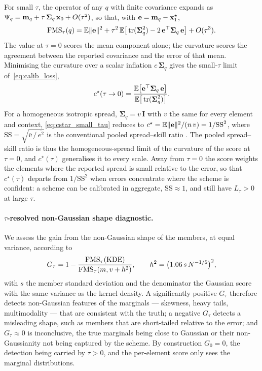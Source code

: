 For small $\tau$, the operator of any $q$ with finite covariance expands as
$\Psi_q = \mathbf{m}_q + \tau\,\boldsymbol{\Sigma}_q\,\mathbf{x}_0 + O(\tau^2)$, so that, with $\mathbf{e} = \mathbf{m}_q - \mathbf{x}_1^\star$,
\begin{equation}\label{eq:fms_small_tau}
  \mathrm{FMS}_\tau(q) = \mathbb{E}\|\mathbf{e}\|^2
  + \tau^2\,\mathbb{E}\big[\operatorname{tr}(\boldsymbol{\Sigma}_q^2) - 2\,\mathbf{e}^\top\boldsymbol{\Sigma}_q\,\mathbf{e}\big]
  + O(\tau^3).
\end{equation}
The value at $\tau = 0$ scores the mean component alone; the curvature scores the
agreement between the reported covariance and the error of that mean. Minimising the curvature over a scalar inflation $c\,\boldsymbol{\Sigma}_q$ gives the small-$\tau$ limit of~\eqref{eq:calib_loss},
\begin{equation}\label{eq:cstar_small_tau}
  c^\star(\tau \to 0) =
  \frac{\mathbb{E}\big[\mathbf{e}^\top\boldsymbol{\Sigma}_q\,\mathbf{e}\big]}
       {\mathbb{E}\big[\operatorname{tr}(\boldsymbol{\Sigma}_q^2)\big]} .
\end{equation}
For a homogeneous isotropic spread, $\boldsymbol{\Sigma}_q = v\,\mathbf{I}$ with $v$ the same for every element and context, \eqref{eq:cstar_small_tau} reduces to
$c^\star = \mathbb{E}\|\mathbf{e}\|^2 / (n\,v) = 1/\mathrm{SS}^2$, where
$\mathrm{SS} = \sqrt{\overline{v}\,/\,\overline{e^2}}$ is the conventional pooled
spread--skill ratio \cite{leutbecher_ensemble_2008,fortin_why_2014}. The pooled spread--skill ratio is thus the homogeneous-spread limit of the curvature of the score at $\tau = 0$, and $c^\star(\tau)$ generalises it to every scale. Away from $\tau = 0$ the score weights the elements where the reported spread is small relative to the error, so that $c^\star(\tau)$ departs from $1/\mathrm{SS}^2$ when errors concentrate where the scheme is confident: a scheme can be calibrated in aggregate, $\mathrm{SS} \approx 1$, and still have $L_\tau > 0$ at large $\tau$.

\paragraph{$\tau$-resolved non-Gaussian shape diagnostic.} We assess the gain from the non-Gaussian shape of the members, at equal variance, according to
\begin{equation}\label{eq:shape_gain}
  G_\tau = 1-\frac{\mathrm{FMS}_\tau(\text{KDE})}{\mathrm{FMS}_\tau(m, v + h^2)} ,
  \qquad h^2 = \big(1.06\, s\, N^{-1/5}\big)^2 ,
\end{equation}
with $s$ the member standard deviation and the denominator the
Gaussian score with the same variance as the kernel density. 
A significantly positive $G_\tau$ therefore detects non-Gaussian
features of the marginals --- skewness, heavy tails, multimodality --- that are
consistent with the truth; a negative $G_\tau$ detects a misleading shape, such as members that are short-tailed relative to the error; and $G_\tau \approx 0$ is
inconclusive, the true marginals being close to Gaussian or their non-Gaussianity not being captured by the scheme. By construction $G_0 = 0$, the detection being carried by $\tau > 0$, and the per-element score only sees the marginal distributions.